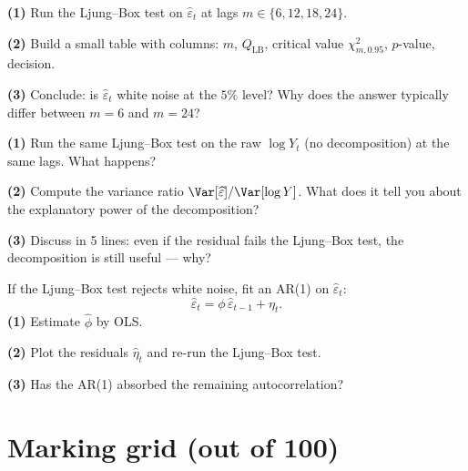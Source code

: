 \documentclass[a4paper,11pt]{article}
\begin{document}
\begin{exercise}
\textbf{(1)} Run the Ljung--Box test on $\widehat\varepsilon_t$ at
lags $m \in \{6, 12, 18, 24\}$.

\textbf{(2)} Build a small table with columns: $m$, $Q_{\text{LB}}$,
critical value $\chi^2_{m, 0.95}$, $p$-value, decision.

\textbf{(3)} Conclude: is $\widehat\varepsilon_t$ white noise at the
$5\%$ level? Why does the answer typically differ between $m = 6$
and $m = 24$?
\end{exercise}

\begin{exercise}
\textbf{(1)} Run the same Ljung--Box test on the raw $\log Y_t$ (no
decomposition) at the same lags. What happens?

\textbf{(2)} Compute the variance ratio
$\Var[\widehat\varepsilon] / \Var[\log Y]$. What does it tell you
about the explanatory power of the decomposition?

\textbf{(3)} Discuss in 5 lines: even if the residual fails the
Ljung--Box test, the decomposition is still useful — why?
\end{exercise}

\begin{exercise}
If the Ljung--Box test rejects white noise, fit an AR(1) on
$\widehat\varepsilon_t$:
\[
  \widehat\varepsilon_t = \phi\, \widehat\varepsilon_{t-1} + \eta_t.
\]
\textbf{(1)} Estimate $\widehat\phi$ by OLS.

\textbf{(2)} Plot the residuals $\widehat\eta_t$ and re-run the
Ljung--Box test.

\textbf{(3)} Has the AR(1) absorbed the remaining autocorrelation?
\end{exercise}

\section*{Marking grid (out of 100)}
\end{document}
